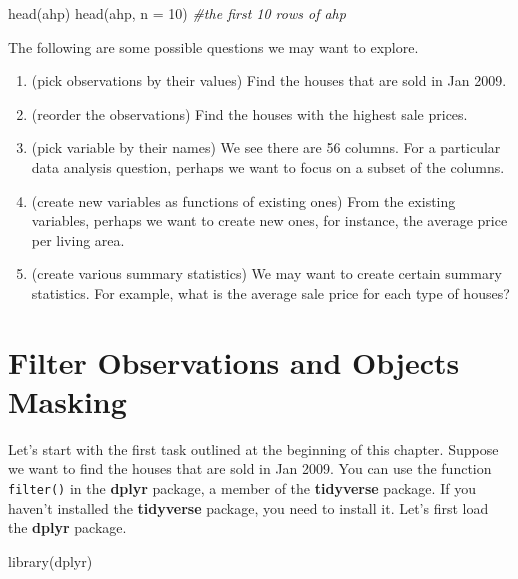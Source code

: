 \documentclass[
]{book}
\newenvironment{Shaded}{\begin{snugshade}}{\end{snugshade}}
\newcommand{\AttributeTok}[1]{\textcolor[rgb]{0.77,0.63,0.00}{#1}}
\newcommand{\CommentTok}[1]{\textcolor[rgb]{0.56,0.35,0.01}{\textit{#1}}}
\newcommand{\DecValTok}[1]{\textcolor[rgb]{0.00,0.00,0.81}{#1}}
\newcommand{\FunctionTok}[1]{\textcolor[rgb]{0.00,0.00,0.00}{#1}}
\newcommand{\NormalTok}[1]{#1}
\begin{document}
\begin{Shaded}
\begin{Highlighting}[]
\FunctionTok{head}\NormalTok{(ahp)}
\FunctionTok{head}\NormalTok{(ahp, }\AttributeTok{n =} \DecValTok{10}\NormalTok{) }\CommentTok{\#the first 10 rows of ahp}
\end{Highlighting}
\end{Shaded}

The following are some possible questions we may want to explore.

\begin{enumerate}
\def\labelenumi{\arabic{enumi}.}
\item
  (pick observations by their values) Find the houses that are sold in Jan 2009.
\item
  (reorder the observations) Find the houses with the highest sale prices.
\item
  (pick variable by their names) We see there are 56 columns. For a particular data analysis question, perhaps we want to focus on a subset of the columns.
\item
  (create new variables as functions of existing ones) From the existing variables, perhaps we want to create new ones, for instance, the average price per living area.
\item
  (create various summary statistics) We may want to create certain summary statistics. For example, what is the average sale price for each type of houses?
\end{enumerate}

\hypertarget{filter-observations}{%
\section{Filter Observations and Objects Masking}\label{filter-observations}}

Let's start with the first task outlined at the beginning of this chapter. Suppose we want to find the houses that are sold in Jan 2009. You can use the function \texttt{filter()} in the \textbf{dplyr} package, a member of the \textbf{tidyverse} package. If you haven't installed the \textbf{tidyverse} package, you need to install it. Let's first load the \textbf{dplyr} package.

\begin{Shaded}
\begin{Highlighting}[]
\FunctionTok{library}\NormalTok{(dplyr)}
\end{Highlighting}
\end{Shaded}
\end{document}
